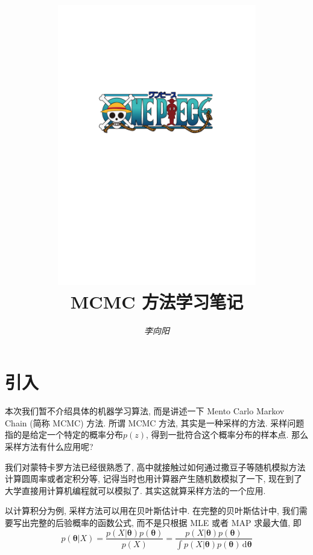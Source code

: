 \documentclass[a4paper,UTF8]{ctexart}
\theoremstyle{plain} \newtheorem{theorem}{定理}[section]
\theoremstyle{plain} \newtheorem{definition}{定义}[section]
\theoremstyle{plain} \newtheorem{lemma}{引理}[section]
\theoremstyle{plain} \newtheorem{proposition}{命题}[section]
\theoremstyle{plain} \newtheorem{example}{例}[section]
\theoremstyle{plain} \newtheorem{remark}{注}[section]
\theoremstyle{plain} \newtheorem{corollary}{推论}[section]
\newcommand\diff{\,{\mathrm d}} %
\begin{document}
\title{
\includegraphics[width=0.65\textwidth]{onepiece.pdf}\\
\vspace{2em}
\textbf{MCMC 方法学习笔记}}
\author{\emph{李向阳}  }
\date{}


\maketitle
\thispagestyle{empty}

\newpage


\tableofcontents

\newpage

\section{引入}
本次我们暂不介绍具体的机器学习算法, 而是讲述一下 Mento Carlo Markov Chain (简称 MCMC) 方法. 所谓 MCMC 方法, 其实是一种采样的方法. 采样问题指的是给定一个特定的概率分布$p(z)$, 得到一批符合这个概率分布的样本点. 那么采样方法有什么应用呢?

我们对蒙特卡罗方法已经很熟悉了, 高中就接触过如何通过撒豆子等随机模拟方法计算圆周率或者定积分等, 记得当时也用计算器产生随机数模拟了一下, 现在到了大学直接用计算机编程就可以模拟了. 其实这就算采样方法的一个应用.

以计算积分为例, 采样方法可以用在贝叶斯估计中. 在完整的贝叶斯估计中, 我们需要写出完整的后验概率的函数公式, 而不是只根据 MLE 或者 MAP 求最大值, 即
\begin{equation*}
p(\bm{\theta} | X) = \frac{p(X | \bm{\theta}) p(\bm{\theta})}{p(X)} = \frac{p(X | \bm{\theta}) p(\bm{\theta})}{\displaystyle \int p(X | \bm{\theta}) p(\bm{\theta}) \diff \bm{\theta}}
\end{equation*}
\end{document}
